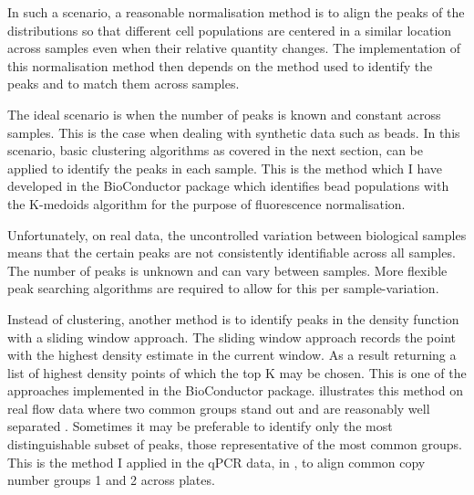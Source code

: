 In such a scenario, a reasonable normalisation method is to align the peaks of the distributions so that different cell populations are centered
in a similar location across samples even when their relative quantity changes.
The implementation of this normalisation method then depends on the method used to identify the peaks and to match them across samples.

The ideal scenario is when the number of peaks is known and constant across samples.
This is the case when dealing with synthetic data such as beads.
In this scenario, basic clustering algorithms as covered in the next section, can be applied to identify the peaks in each sample.
This is the method which I have developed in the  BioConductor package which identifies bead populations with the K-medoids algorithm
for the purpose of fluorescence normalisation.

Unfortunately, on real data, the uncontrolled variation between biological samples means that the certain peaks are not consistently identifiable across all samples.
The number of peaks is unknown and can vary between samples. 
More flexible peak searching algorithms are required to allow for this per sample-variation.

Instead of clustering, another method is to identify peaks in the density function with a sliding window approach.
The sliding window approach records the point with the highest density estimate in the current window.
As a result returning a list of highest density points of which the top K may be chosen.
This is one of the approaches implemented in the  BioConductor package.
 illustrates this method on real flow data where two common groups stand out and are reasonably well separated .
Sometimes it may be preferable to identify only the most distinguishable subset of peaks, those representative of the most common groups.
This is the method I applied in the qPCR data, in , to align common copy number groups 1 and 2 across plates.


